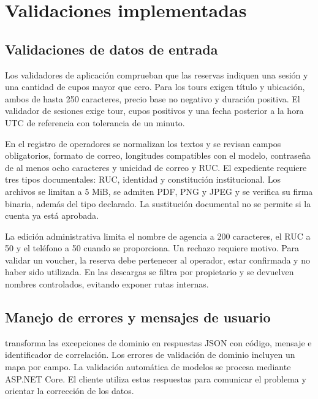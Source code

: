 \section{Validaciones implementadas}
\subsection{Validaciones de datos de entrada}
Los validadores de aplicación comprueban que las reservas indiquen una sesión y una cantidad de cupos mayor que cero. Para los tours exigen título y ubicación, ambos de hasta 250 caracteres, precio base no negativo y duración positiva. El validador de sesiones exige tour, cupos positivos y una fecha posterior a la hora UTC de referencia con tolerancia de un minuto.

En el registro de operadores se normalizan los textos y se revisan campos obligatorios, formato de correo, longitudes compatibles con el modelo, contraseña de al menos ocho caracteres y unicidad de correo y RUC. El expediente requiere tres tipos documentales: RUC, identidad y constitución institucional. Los archivos se limitan a 5 MiB, se admiten PDF, PNG y JPEG y se verifica su firma binaria, además del tipo declarado. La sustitución documental no se permite si la cuenta ya está aprobada.

La edición administrativa limita el nombre de agencia a 200 caracteres, el RUC a 50 y el teléfono a 50 cuando se proporciona. Un rechazo requiere motivo. Para validar un voucher, la reserva debe pertenecer al operador, estar confirmada y no haber sido utilizada. En las descargas se filtra por propietario y se devuelven nombres controlados, evitando exponer rutas internas.

\subsection{Manejo de errores y mensajes de usuario}
 transforma las excepciones de dominio en respuestas JSON con código, mensaje e identificador de correlación. Los errores de validación de dominio incluyen un mapa por campo. La validación automática de modelos se procesa mediante ASP.NET Core. El cliente utiliza estas respuestas para comunicar el problema y orientar la corrección de los datos.

